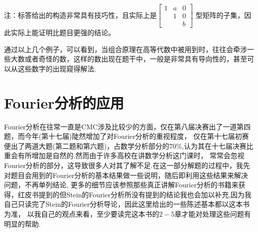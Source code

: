 \documentclass[12pt]{ctexart}  %
\begin{document}
注：标答给出的构造非常具有技巧性，且实际上是\(
\begin{bmatrix}
1 & a & 0 \\
& 1 & 0 \\
& & b
\end{bmatrix}
\)
型矩阵的子集，因此实际上能证明比题目更强的结论。


通过以上几个例子，可以看到，当组合原理在高等代数中被用到时，往往会牵涉一些大数或者奇怪的数，这样的数出现在题干中，一般是非常具有导向性的，甚至可以从这些数字的出现窥得解法.





\section{Fourier分析的应用}
Fourier分析在往常一直是CMC涉及比较少的方面，仅在第八届决赛出了一道第四题，而今年(第十七届)陡然增加了对Fourier分析的重视程度，
仅在第十七届初赛便出了两道大题(第二题和第六题)，占数学分析部分的70\%,认为其在十七届决赛比重会有所增加是自然的.然而由于许多高校在讲数学分析这门课时，
常常会忽视Fourier分析的部分，这导致很多人对其了解不足.在这一部分解题的过程中，我先对题目会用到的Fourier分析的基本结果做一些说明，随后即利用这些结果来解决问题，不再单列结论,
更多的细节应该参照那些真正讲解Fourier分析的书籍来获得，红皮书提到的但Stein的Fourier分析所没有提到的结论我也会加以补充,因为我自己只读完了Stein的Fourier分析导论，因此这里给出的一些陈述基本都以这本书为准，
以我自己的观点来看，至少要读完这本书的$2-5$章才能对处理这些问题有明显的帮助.
\end{document}
